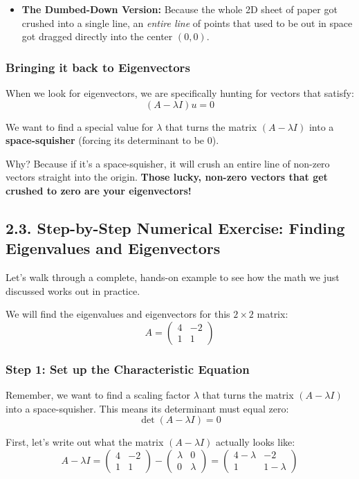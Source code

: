 \documentclass{article}
\begin{document}
\begin{itemize}
    \item \textbf{The Dumbed-Down Version:} Because the whole 2D sheet of paper got crushed into a single line, an \textit{entire line} of points that used to be out in space got dragged directly into the center $(0,0)$. 
\end{itemize}

\subsubsection*{Bringing it back to Eigenvectors}

When we look for eigenvectors, we are specifically hunting for vectors that satisfy:
\[ (A - \lambda I)u = 0 \]

We want to find a special value for $\lambda$ that turns the matrix $(A - \lambda I)$ into a \textbf{space-squisher} (forcing its determinant to be $0$). 

Why? Because if it's a space-squisher, it will crush an entire line of non-zero vectors straight into the origin. \textbf{Those lucky, non-zero vectors that get crushed to zero are your eigenvectors!}

\subsection*{2.3. Step-by-Step Numerical Exercise: Finding Eigenvalues and Eigenvectors}

Let's walk through a complete, hands-on example to see how the math we just discussed works out in practice. 

We will find the eigenvalues and eigenvectors for this $2 \times 2$ matrix:
\[ A = \begin{pmatrix} 4 & -2 \\ 1 &  1 \end{pmatrix} \]

\subsubsection*{Step 1: Set up the Characteristic Equation}

Remember, we want to find a scaling factor $\lambda$ that turns the matrix $(A - \lambda I)$ into a space-squisher. This means its determinant must equal zero:
\[ \det(A - \lambda I) = 0 \]

First, let's write out what the matrix $(A - \lambda I)$ actually looks like:
\[ A - \lambda I = \begin{pmatrix} 4 & -2 \\ 1 & 1 \end{pmatrix} - \begin{pmatrix} \lambda & 0 \\ 0 & \lambda \end{pmatrix} = \begin{pmatrix} 4-\lambda & -2 \\ 1 & 1-\lambda \end{pmatrix} \]
\end{document}
